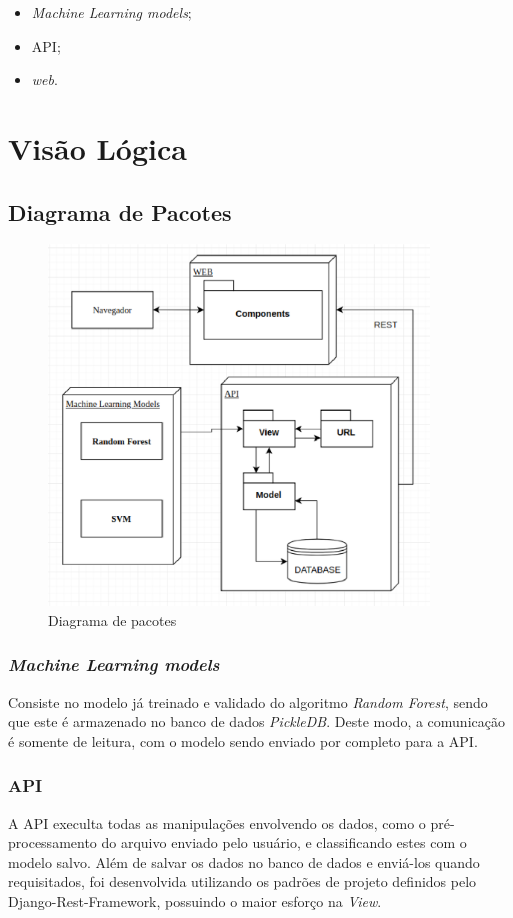 \begin{anexosenv}
    \begin{itemize}
        \item \textit{Machine Learning models};
        \item API;
        \item \textit{web}.
    \end{itemize}


   \section{Visão Lógica}
   \subsection{Diagrama de Pacotes}
   \begin{figure}[!htb]
        \centering
        \includegraphics[width=0.9\textwidth]{figuras/diagrama_pacotes.eps}
        \caption{Diagrama de pacotes}
        \label{diagramadepacotes}
    \end{figure}
    \subsubsection{\textit{Machine Learning models}}
    Consiste no modelo já treinado e validado do algoritmo \textit{Random Forest}, sendo que este é armazenado no banco de dados \textit{PickleDB}. Deste modo, a comunicação é somente de leitura, com o modelo sendo enviado por completo para a API.
    \subsubsection{API}
    A API execulta todas as manipulações envolvendo os dados, como o pré-processamento do arquivo enviado pelo usuário, e classificando estes com o modelo salvo. Além de salvar os dados no banco de dados e enviá-los quando requisitados, foi desenvolvida utilizando os padrões de projeto definidos pelo Django-Rest-Framework, possuindo o maior esforço na \textit{View}.


\end{anexosenv}

